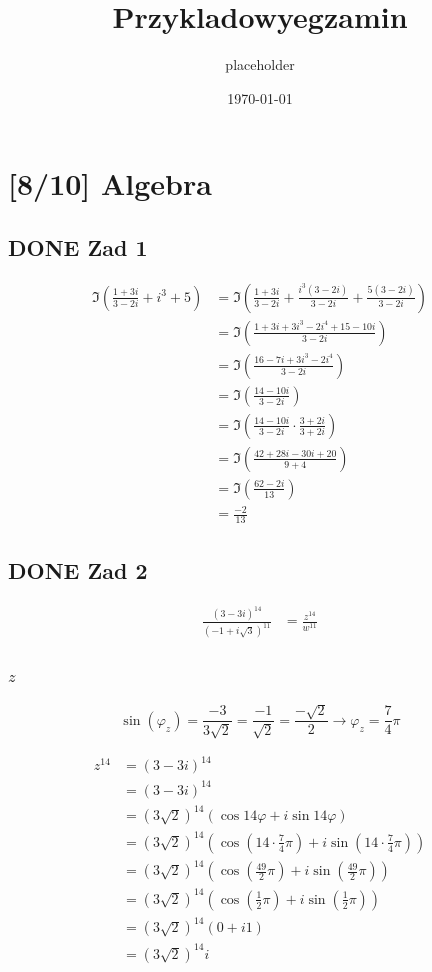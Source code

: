 \documentclass[11pt]{article}
\author{placeholder}
\date{\today}
\title{Przykladowyegzamin}
\begin{document}
\maketitle
\tableofcontents

\section{[8/10] Algebra}
\label{sec:orgefcc94b}
\subsection{{\bfseries\sffamily DONE} Zad 1}
\label{sec:org88f06e8}
\begin{align*}
\Im \left(\frac{1+3i}{3-2i} + i^{3} + 5\right)
 &=\Im \left(\frac{1+3i}{3-2i} + \frac{i^{3}(3-2i)}{3-2i} + \frac{5(3-2i)}{3-2i}\right)\\
 &= \Im \left(\frac{1+3i + 3i^3 - 2 i^4 + 15 - 10i}{3-2i}\right)\\
 &= \Im \left(\frac{16 - 7i + 3i^{3} -2i^{4}}{3-2i}\right)\\
 &= \Im \left(\frac{14 - 10i}{3-2i}\right)\\
 &= \Im \left(\frac{14 - 10i}{3-2i} \cdot \frac{3+2i}{3+2i}\right)\\
 &= \Im \left(\frac{42 + 28i - 30i + 20}{9 + 4}\right)\\
 &= \Im \left(\frac{62 - 2i }{13}\right)\\
 &= \frac{-2}{13}
\end{align*}
\subsection{{\bfseries\sffamily DONE} Zad 2}
\label{sec:orga7a9403}
\begin{align*}
  \frac{ { (3 - 3i)}^{14} }
  { { (-1+i\sqrt{3}) }^{11} }
  &= \frac{z^{14}}{w^{11}}
\end{align*}
\subsubsection{\(z\)}
\label{sec:org2e6e5c5}
$$\sin(\varphi_z) = \frac{-3}{3\sqrt{2}}
 = \frac{-1}{\sqrt{2}}
 = \frac{-\sqrt{2}}{2} \to \varphi_z = \frac{7}{4}\pi$$

\begin{align*}
  z^{14} &= {(3 - 3i)}^{14}\\
  &= {(3-3i)}^{14}\\
  &= {(3\sqrt{2})}^{14}(\cos 14 \varphi + i \sin 14 \varphi)\\
  &= {(3\sqrt{2})}^{14} \left(\cos \left(14 \cdot \frac{7}{4} \pi \right) + i \sin \left(14 \cdot \frac{7}{4} \pi \right) \right)\\
  &= {(3\sqrt{2})}^{14} \left( \cos \left ( \frac{49}{2} \pi \right) + i \sin \left(\frac{49}{2} \pi \right) \right)\\
  &= {(3\sqrt{2})}^{14} \left( \cos \left ( \frac{1}{2} \pi \right) + i \sin \left(\frac{1}{2} \pi \right) \right)\\
  &= {(3\sqrt{2})}^{14} ( 0 + i 1 )\\
  &= {(3\sqrt{2})}^{14}i
\end{align*}
\end{document}
